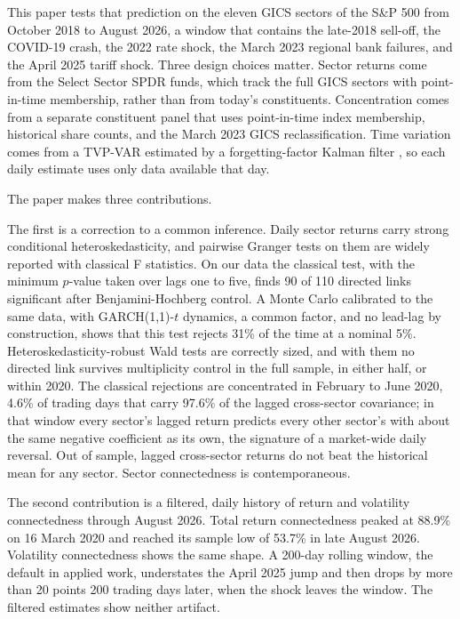 \documentclass[11pt]{article}
\begin{document}
This paper tests that prediction on the eleven GICS sectors of the S\&P 500 from October 2018 to August 2026, a window that contains the late-2018 sell-off, the COVID-19 crash, the 2022 rate shock, the March 2023 regional bank failures, and the April 2025 tariff shock. Three design choices matter. Sector returns come from the Select Sector SPDR funds, which track the full GICS sectors with point-in-time membership, rather than from today's constituents. Concentration comes from a separate constituent panel that uses point-in-time index membership, historical share counts, and the March 2023 GICS reclassification. Time variation comes from a TVP-VAR estimated by a forgetting-factor Kalman filter \citep{koop2013, antonakakis2020}, so each daily estimate uses only data available that day.

The paper makes three contributions.

The first is a correction to a common inference. Daily sector returns carry strong conditional heteroskedasticity, and pairwise Granger tests on them are widely reported with classical F statistics. On our data the classical test, with the minimum $p$-value taken over lags one to five, finds 90 of 110 directed links significant after Benjamini-Hochberg control. A Monte Carlo calibrated to the same data, with GARCH(1,1)-$t$ dynamics, a common factor, and no lead-lag by construction, shows that this test rejects 31\% of the time at a nominal 5\%. Heteroskedasticity-robust Wald tests are correctly sized, and with them no directed link survives multiplicity control in the full sample, in either half, or within 2020. The classical rejections are concentrated in February to June 2020, 4.6\% of trading days that carry 97.6\% of the lagged cross-sector covariance; in that window every sector's lagged return predicts every other sector's with about the same negative coefficient as its own, the signature of a market-wide daily reversal. Out of sample, lagged cross-sector returns do not beat the historical mean for any sector. Sector connectedness is contemporaneous.

The second contribution is a filtered, daily history of return and volatility connectedness through August 2026. Total return connectedness peaked at 88.9\% on 16 March 2020 and reached its sample low of 53.7\% in late August 2026. Volatility connectedness shows the same shape. A 200-day rolling window, the default in applied work, understates the April 2025 jump and then drops by more than 20 points 200 trading days later, when the shock leaves the window. The filtered estimates show neither artifact.
\end{document}
